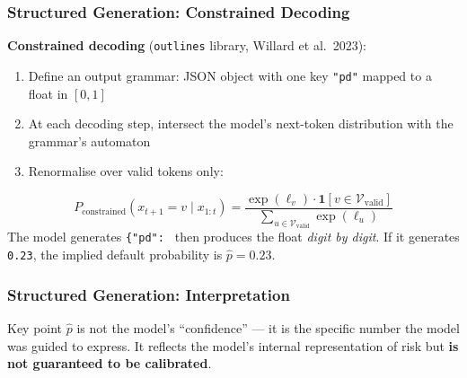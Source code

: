 \documentclass[9pt,t]{beamer}
\begin{document}
\begin{frame}
\frametitle{Structured Generation: Constrained Decoding}

\begin{underhood}
\textbf{Constrained decoding} (\texttt{outlines} library, Willard et al.\ 2023):
\begin{enumerate}
  \item Define an output grammar: JSON object with one key \texttt{"pd"} mapped to a float in $[0, 1]$
  \item At each decoding step, intersect the model's next-token distribution with the grammar's automaton
  \item Renormalise over valid tokens only:
\end{enumerate}
\[
  P_{\text{constrained}}(x_{t+1} = v \mid x_{1:t}) = \frac{\exp(\ell_v) \cdot \mathbf{1}[v \in \mathcal{V}_{\text{valid}}]}{\sum_{u \in \mathcal{V}_{\text{valid}}} \exp(\ell_u)}
\]
The model generates \texttt{\{"pd": } then produces the float \emph{digit by digit}. If it generates \texttt{0.23}, the implied default probability is $\hat{p} = 0.23$.
\end{underhood}
\end{frame}

\begin{frame}
\frametitle{Structured Generation: Interpretation}

\begin{alertblock}{Key point}
  $\hat{p}$ is not the model's ``confidence'' --- it is the specific number the model was guided
  to express. It reflects the model's internal representation of risk but \textbf{is not guaranteed
  to be calibrated}.
\end{alertblock}
\end{frame}
\end{document}
